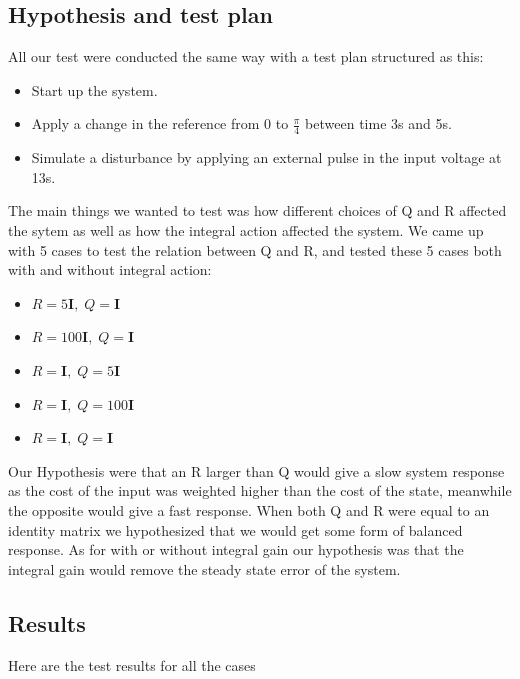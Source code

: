 \subsection{Hypothesis and test plan}
All our test were conducted the same way with a test plan structured as this: 
\begin{itemize}
	\item Start up the system.
	\item Apply a change in the reference from 0 to $\frac{\pi}{4}$ between time 3s and 5s. 
	\item Simulate a disturbance by applying an external pulse in the input voltage at 13s.
\end{itemize}
The main things we wanted to test was how different choices of Q and R affected the sytem as well as how the integral action affected the system. 
We came up with 5 cases to test the relation between Q and R, and tested these 5 cases both with and without integral action:
\begin{itemize}
	\item $R = 5\mathbf{I},\; Q=\mathbf{I}$
	\item $R = 100\mathbf{I},\; Q=\mathbf{I}$
	\item $R = \mathbf{I},\; Q=5\mathbf{I}$
	\item $R = \mathbf{I},\; Q=100\mathbf{I}$
	\item $R = \mathbf{I},\; Q=\mathbf{I}$
\end{itemize}
Our Hypothesis were that an R larger than Q would give a slow system response as the cost of the input was weighted higher than the cost of the state, meanwhile the opposite would give a fast response. 
When both Q and R were equal to an identity matrix we hypothesized that we would get some form of balanced response. 
As for with or without integral gain our hypothesis was that the integral gain would remove the steady state error of the system.

\subsection{Results}
Here are the test results for all the cases


